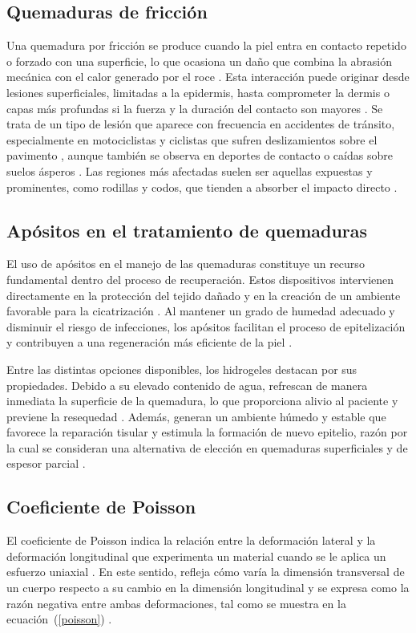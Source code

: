 \documentclass[../../DocumentoCompleto.tex]{subfiles}
\begin{document}
  \subsection{Quemaduras de fricción}
 Una quemadura por fricción se produce cuando la piel entra en contacto repetido o forzado con una superficie, lo que ocasiona un daño que combina la abrasión mecánica con el calor generado por el roce \cite{Zuluaga2023}. Esta interacción puede originar desde lesiones superficiales, limitadas a la epidermis, hasta comprometer la dermis o capas más profundas si la fuerza y la duración del contacto son mayores \cite{Tracy2023}. Se trata de un tipo de lesión que aparece con frecuencia en accidentes de tránsito, especialmente en motociclistas y ciclistas que sufren deslizamientos sobre el pavimento \cite{Perkins2025}, aunque también se observa en deportes de contacto o caídas sobre suelos ásperos \cite{MacFarlane2021}. Las regiones más afectadas suelen ser aquellas expuestas y prominentes, como rodillas y codos, que tienden a absorber el impacto directo \cite{Perkins2024}.

  \subsection{Apósitos en el tratamiento de quemaduras}
El uso de apósitos en el manejo de las quemaduras constituye un recurso fundamental dentro del proceso de recuperación. Estos dispositivos intervienen directamente en la protección del tejido dañado y en la creación de un ambiente favorable para la cicatrización \cite{Noor2022}. Al mantener un grado de humedad adecuado y disminuir el riesgo de infecciones, los apósitos facilitan el proceso de epitelización y contribuyen a una regeneración más eficiente de la piel \cite{Opriessnig2023}.  

\par  
Entre las distintas opciones disponibles, los hidrogeles destacan por sus propiedades. Debido a su elevado contenido de agua, refrescan de manera inmediata la superficie de la quemadura, lo que proporciona alivio al paciente y previene la resequedad \cite{Shu2021}. Además, generan un ambiente húmedo y estable que favorece la reparación tisular y estimula la formación de nuevo epitelio, razón por la cual se consideran una alternativa de elección en quemaduras superficiales y de espesor parcial \cite{Celik2024}.


  \subsection{Coeficiente de Poisson}
El coeficiente de Poisson indica la relación entre la deformación lateral y la deformación longitudinal que experimenta un material cuando se le aplica un esfuerzo uniaxial \cite{Farzaneh2022}. En este sentido, refleja cómo varía la dimensión transversal de un cuerpo respecto a su cambio en la dimensión longitudinal y se expresa como la razón negativa entre ambas deformaciones, tal como se muestra en la ecuación~(\ref{poisson}) \cite{Chang2022}.
\end{document}
